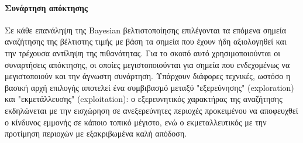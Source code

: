  	\paragraph{Συνάρτηση απόκτησης} Σε κάθε επανάληψη της Bayesian βελτιστοποίησης επιλέγονται τα επόμενα σημεία αναζήτησης της βέλτιστης τιμής με βάση τα σημεία που έχουν ήδη αξιολογηθεί και την τρέχουσα αντίληψη της πιθανότητας. Για το σκοπό αυτό χρησιμοποιούνται οι συναρτήσεις απόκτησης, οι οποίες μεγιστοποιούνται για σημεία που ενδεχομένως να μεγιστοποιούν και την άγνωστη συνάρτηση. Υπάρχουν διάφορες τεχνικές, ωστόσο η βασική αρχή επιλογής αποτελεί ένα συμβιβασμό μεταξύ "εξερεύνησης" (exploration) και "εκμετάλλευσης" (exploitation): ο εξερευνητικός χαρακτήρας της αναζήτησης εκδηλώνεται με την εισχώρηση σε ανεξερεύνητες περιοχές προκειμένου να αποφευχθεί ο κίνδυνος εμμονής σε κάποιο τοπικό μέγιστο, ενώ ο εκμεταλλευτικός με την προτίμηση περιοχών με εξακριβωμένα καλή απόδοση.

